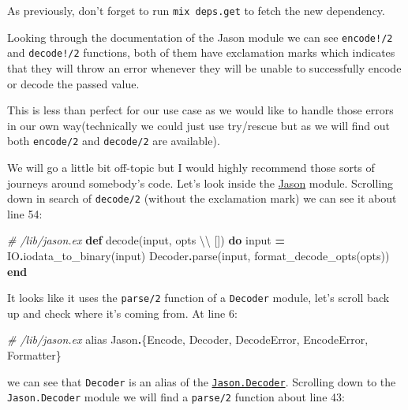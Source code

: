 \documentclass[
]{book}
\newenvironment{Shaded}{\begin{snugshade}}{\end{snugshade}}
\newcommand{\CommentTok}[1]{\textcolor[rgb]{0.56,0.35,0.01}{\textit{#1}}}
\newcommand{\ConstantTok}[1]{\textcolor[rgb]{0.00,0.00,0.00}{#1}}
\newcommand{\ImportTok}[1]{#1}
\newcommand{\KeywordTok}[1]{\textcolor[rgb]{0.13,0.29,0.53}{\textbf{#1}}}
\newcommand{\NormalTok}[1]{#1}
\newcommand{\OperatorTok}[1]{\textcolor[rgb]{0.81,0.36,0.00}{\textbf{#1}}}
\begin{document}
As previously, don't forget to run \texttt{mix\ deps.get} to fetch the new dependency.

Looking through the documentation of the Jason module we can see \texttt{encode!/2} and \texttt{decode!/2} functions, both of them have exclamation marks which indicates that they will throw an error whenever they will be unable to successfully encode or decode the passed value.

This is less than perfect for our use case as we would like to handle those errors in our own way(technically we could just use try/rescue but as we will find out both \texttt{encode/2} and \texttt{decode/2} are available).

We will go a little bit off-topic but I would highly recommend those sorts of journeys around somebody's code. Let's look inside the \href{https://github.com/michalmuskala/jason/blob/master/lib/jason.ex}{Jason} module. Scrolling down in search of \texttt{decode/2} (without the exclamation mark) we can see it about line 54:

\begin{Shaded}
\begin{Highlighting}[]
  \CommentTok{\# /lib/jason.ex}
  \KeywordTok{def}\NormalTok{ decode(input, opts \textbackslash{}\textbackslash{} []) }\KeywordTok{do}
\NormalTok{    input }\OperatorTok{=} \ConstantTok{IO}\OperatorTok{.}\NormalTok{iodata\_to\_binary(input)}
    \ConstantTok{Decoder}\OperatorTok{.}\NormalTok{parse(input, format\_decode\_opts(opts))}
  \KeywordTok{end}
\end{Highlighting}
\end{Shaded}

It looks like it uses the \texttt{parse/2} function of a \texttt{Decoder} module, let's scroll back up and check where it's coming from. At line 6:

\begin{Shaded}
\begin{Highlighting}[]
\CommentTok{\# /lib/jason.ex}
\ImportTok{alias} \ConstantTok{Jason}\OperatorTok{.}\NormalTok{\{}\ConstantTok{Encode}\NormalTok{, }\ConstantTok{Decoder}\NormalTok{, }\ConstantTok{DecodeError}\NormalTok{, }\ConstantTok{EncodeError}\NormalTok{, }\ConstantTok{Formatter}\NormalTok{\}}
\end{Highlighting}
\end{Shaded}

we can see that \texttt{Decoder} is an alias of the \href{https://github.com/michalmuskala/jason/blob/master/lib/decoder.ex}{\texttt{Jason.Decoder}}. Scrolling down to the \texttt{Jason.Decoder} module we will find a \texttt{parse/2} function about line 43:
\end{document}
